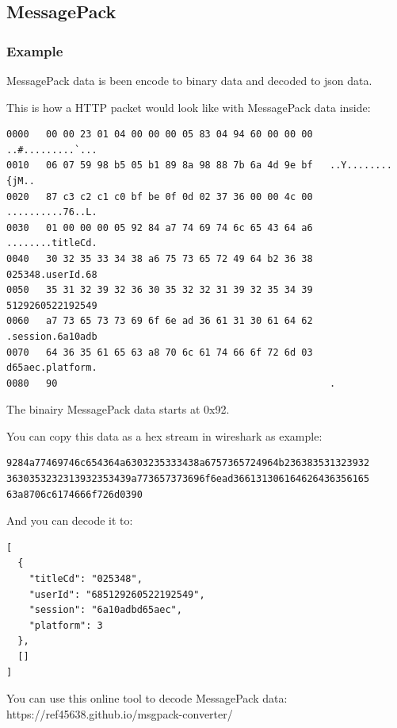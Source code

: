 \subsection{MessagePack}

\subsubsection{Example}

MessagePack data is been encode to binary data and decoded to json data.

This is how a HTTP packet would look like with MessagePack data inside:

\begin{lstlisting}[style=hexdump]
0000   00 00 23 01 04 00 00 00 05 83 04 94 60 00 00 00   ..#.........`...
0010   06 07 59 98 b5 05 b1 89 8a 98 88 7b 6a 4d 9e bf   ..Y........{jM..
0020   87 c3 c2 c1 c0 bf be 0f 0d 02 37 36 00 00 4c 00   ..........76..L.
0030   01 00 00 00 05 92 84 a7 74 69 74 6c 65 43 64 a6   ........titleCd.
0040   30 32 35 33 34 38 a6 75 73 65 72 49 64 b2 36 38   025348.userId.68
0050   35 31 32 39 32 36 30 35 32 32 31 39 32 35 34 39   5129260522192549
0060   a7 73 65 73 73 69 6f 6e ad 36 61 31 30 61 64 62   .session.6a10adb
0070   64 36 35 61 65 63 a8 70 6c 61 74 66 6f 72 6d 03   d65aec.platform.
0080   90                                                .
\end{lstlisting}

The binairy MessagePack data starts at 0x92.

You can copy this data as a hex stream in wireshark as example:

\begin{lstlisting}[style=hexstream]
9284a77469746c654364a6303235333438a6757365724964b236383531323932
3630353232313932353439a773657373696f6ead366131306164626436356165
63a8706c6174666f726d0390
\end{lstlisting}

And you can decode it to:

\begin{lstlisting}
[
  {
    "titleCd": "025348",
    "userId": "685129260522192549",
    "session": "6a10adbd65aec",
    "platform": 3
  },
  []
]
\end{lstlisting}

\begin{tcolorbox}[colback=green!10,colframe=blue!80!black,title=Info]
You can use this online tool to decode MessagePack data: https://ref45638.github.io/msgpack-converter/
\end{tcolorbox}

